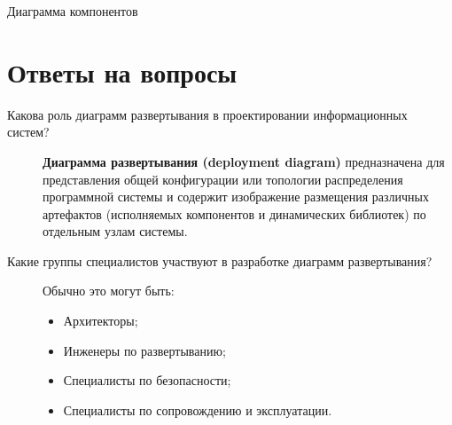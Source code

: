 \begin{image}
	\caption{Диаграмма компонентов}
	\label{fig:deployments}
\end{image}

\clearpage

\section*{Ответы на вопросы}

\begin{description}
	\item [Какова роль диаграмм развертывания в проектировании
		информационных систем?]
		\textbf{Диаграмма развертывания (deployment diagram)} предназначена
		для представления общей конфигурации или топологии распределения
		программной системы и содержит изображение размещения различных
		артефактов (исполняемых компонентов и динамических библиотек) по
		отдельным узлам системы.
	\item [Какие группы специалистов участвуют в разработке диаграмм
		развертывания?]
		Обычно это могут быть:
		\begin{itemize}
			\item Архитекторы;
			\item Инженеры по развертыванию;
			\item Специалисты по безопасности;
			\item Специалисты по сопровождению и эксплуатации.
		\end{itemize}


\end{description}
